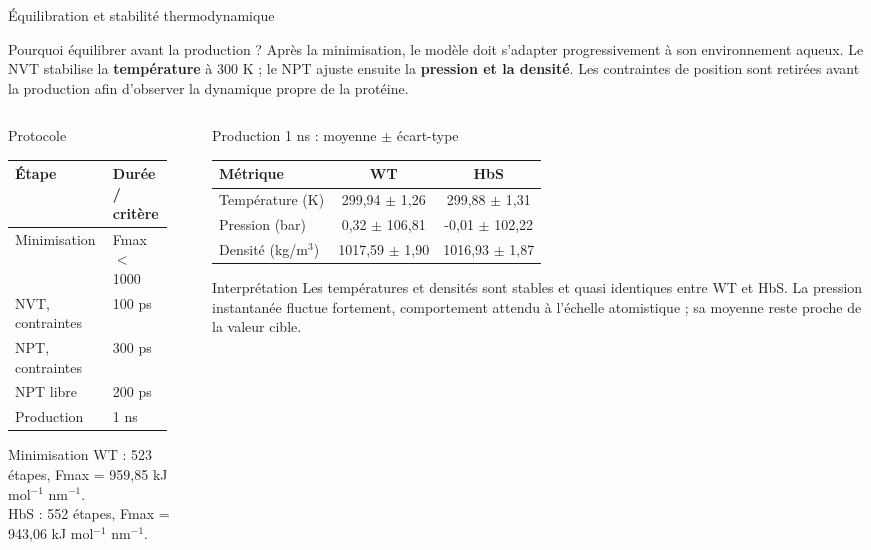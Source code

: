 \documentclass[aspectratio=169,10pt]{beamer}
\begin{document}
\begin{frame}[shrink=1]{Équilibration et stabilité thermodynamique}
\small
\begin{block}{Pourquoi équilibrer avant la production ?}
\footnotesize
Après la minimisation, le modèle doit s'adapter progressivement à son environnement aqueux. Le NVT stabilise la \textbf{température} à 300 K ; le NPT ajuste ensuite la \textbf{pression et la densité}. Les contraintes de position sont retirées avant la production afin d'observer la dynamique propre de la protéine.
\end{block}

\begin{columns}[T,totalwidth=\textwidth]
\begin{column}{0.46\textwidth}
\begin{block}{Protocole}
\footnotesize
\begin{tabular}{p{0.58\linewidth}p{0.29\linewidth}}
\toprule
Étape & Durée / critère \\
\midrule
Minimisation & Fmax $<$ 1000 \\
NVT, contraintes & 100 ps \\
NPT, contraintes & 300 ps \\
NPT libre & 200 ps \\
Production & 1 ns \\
\bottomrule
\end{tabular}
\end{block}
\begin{block}{Minimisation}
\scriptsize
WT : 523 étapes, Fmax = 959,85 kJ mol\(^{-1}\) nm\(^{-1}\).\\
HbS : 552 étapes, Fmax = 943,06 kJ mol\(^{-1}\) nm\(^{-1}\).
\end{block}
\end{column}
\begin{column}{0.51\textwidth}
\begin{block}{Production 1 ns : moyenne $\pm$ écart-type}
\footnotesize
\begin{tabular}{lcc}
\toprule
Métrique & WT & HbS \\
\midrule
Température (K) & 299,94 $\pm$ 1,26 & 299,88 $\pm$ 1,31 \\
Pression (bar) & 0,32 $\pm$ 106,81 & -0,01 $\pm$ 102,22 \\
Densité (kg/m\(^3\)) & 1017,59 $\pm$ 1,90 & 1016,93 $\pm$ 1,87 \\
\bottomrule
\end{tabular}
\end{block}
\begin{block}{Interprétation}
\footnotesize
Les températures et densités sont stables et quasi identiques entre WT et HbS. La pression instantanée fluctue fortement, comportement attendu à l'échelle atomistique ; sa moyenne reste proche de la valeur cible.
\end{block}
\end{column}
\end{columns}
\end{frame}
\end{document}
